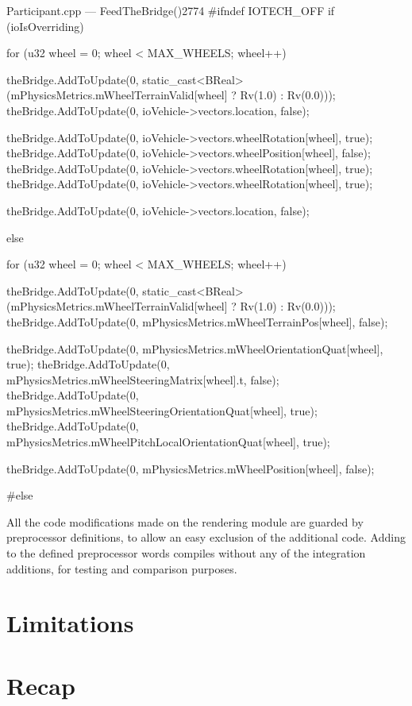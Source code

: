 \begin{codelist}{Participant.cpp --- FeedTheBridge()}{2774}
#ifndef IOTECH_OFF
	if (ioIsOverriding) {
		for (u32 wheel = 0; wheel < MAX_WHEELS; wheel++) {
			theBridge.AddToUpdate(0, static_cast<BReal>(mPhysicsMetrics.mWheelTerrainValid[wheel] ? Rv(1.0) : Rv(0.0)));
			theBridge.AddToUpdate(0, ioVehicle->vectors.location, false);

			theBridge.AddToUpdate(0, ioVehicle->vectors.wheelRotation[wheel], true);
			theBridge.AddToUpdate(0, ioVehicle->vectors.wheelPosition[wheel], false);
			theBridge.AddToUpdate(0, ioVehicle->vectors.wheelRotation[wheel], true);
			theBridge.AddToUpdate(0, ioVehicle->vectors.wheelRotation[wheel], true);

			theBridge.AddToUpdate(0, ioVehicle->vectors.location, false);
		}
	}
	else {
		for (u32 wheel = 0; wheel < MAX_WHEELS; wheel++) {
			theBridge.AddToUpdate(0, static_cast<BReal>(mPhysicsMetrics.mWheelTerrainValid[wheel] ? Rv(1.0) : Rv(0.0)));
			theBridge.AddToUpdate(0, mPhysicsMetrics.mWheelTerrainPos[wheel], false);

			theBridge.AddToUpdate(0, mPhysicsMetrics.mWheelOrientationQuat[wheel], true);
			theBridge.AddToUpdate(0, mPhysicsMetrics.mWheelSteeringMatrix[wheel].t, false);
			theBridge.AddToUpdate(0, mPhysicsMetrics.mWheelSteeringOrientationQuat[wheel], true);
			theBridge.AddToUpdate(0, mPhysicsMetrics.mWheelPitchLocalOrientationQuat[wheel], true);

			theBridge.AddToUpdate(0, mPhysicsMetrics.mWheelPosition[wheel], false);
		}
	}
#else
\end{codelist}

All the code modifications made on the rendering module are guarded by preprocessor definitions, to allow an easy exclusion of the additional code. Adding  to the defined preprocessor words compiles without any of the integration additions, for testing and comparison purposes.

\section{Limitations}\label{sc:integration:limitations}

\section{Recap}\label{sc:integration:recap}
